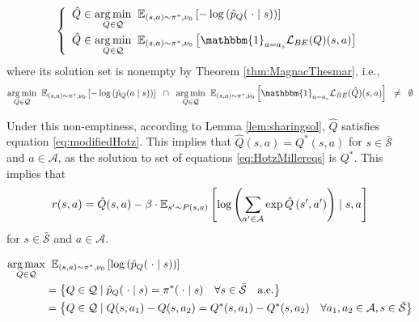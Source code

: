 \begin{equation}
\left\{
\begin{array}{l}
    \hat{Q} \in \underset{Q\in \mathcal{Q}}{\arg\min } \; \;\mathbb{E}_{(s, a)\sim \pi^*, \nu_0}  \left[-\log\left(\hat{p}_{Q}(\;\cdot
    \mid s)\right)\right] 
    \\[1em]
     \hat{Q} \in \underset{Q\in \mathcal{Q}}{\arg\min } \; \;\mathbb{E}_{(s, a)\sim \pi^*, \nu_0}  \left[\mathbbm{1}_{a = a_s} \mathcal{L}_{BE}(Q)(s,a)\right]
    
\end{array}\label{eq:modifiedHotz}
\right. 
\end{equation}
where its solution set is nonempty by Theorem \ref{thm:MagnacThesmar}, i.e., 
$$ \underset{Q\in \mathcal{Q}}{\arg\min } \; \;\mathbb{E}_{(s, a)\sim \pi^*, \nu_0} \left[-\log\left(\hat{p}_{Q}(a
\mid s)\right)\right] \;\; \cap \;\; \underset{Q\in \mathcal{Q}}{\arg\min } \; \; \mathbb{E}_{(s, a)\sim \pi^*, \nu_0} \left[\mathbbm{1}_{a = a_s}\mathcal{L}_{BE}(\hat{Q})(s,a)\right] \;\; \neq \;\; \emptyset$$ 

Under this non-emptiness, according to Lemma \ref{lem:sharingsol}, $\hat{Q}$ satisfies equation \ref{eq:modifiedHotz}. This implies that $\hat{Q}(s,a) = Q^\ast(s,a)$ for $s\in\bar{\mathcal{S}}$ and $a\in\mathcal{A}$, as the solution to set of equations \ref{eq:HotzMillereqs} is $Q^*$. This implies that 
\begin{align}
    r(s, a)=\hat{Q}(s, a)-\beta \cdot \mathbb{E}_{s^{\prime} \sim P(s, a)}\left[\log \left(\sum_{a^{\prime} \in \mathcal{A}} \exp \hat{Q}\left(s^{\prime}, a^{\prime}\right)\right) \mid s, a\right] \notag
\end{align}
for $s\in\bar{\mathcal{S}}$ and $a\in\mathcal{A}$.
\QED


\begin{lem}\label{lem:minMLE}
    \begin{align}
           \underset{Q\in \mathcal{Q}}{\arg\max } &\; \;\mathbb{E}_{(s, a)\sim \pi^*, \nu_0}  \left[\log\left(\hat{p}_{Q}(\;\cdot
    \mid s)\right)\right] \notag
    \\
     &=\left\{Q \in \mathcal{Q} \mid\hat{p}_{Q}(\;\cdot
    \mid s) = \pi^*(\;\cdot
    \mid s)\quad  \forall s\in\bar{\mathcal{S}}\quad\text{a.e.}\right\}\notag
    \\
     &=\left\{Q \in \mathcal{Q} \mid Q(s,a_1)-Q(s,a_2)= Q^*(s,a_1)-Q^*(s,a_2) \quad \forall a_1, a_2\in\mathcal{A}, s\in\bar{\mathcal{S}}\right\} \notag
    \end{align}
\end{lem}

